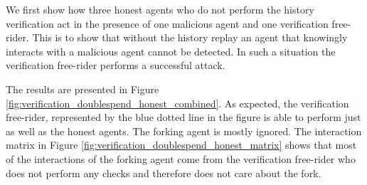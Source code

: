 We first show how three honest agents who do not perform the history verification act in the 
presence of one malicious agent and one verification free-rider. This is to show that without the 
history replay an agent that knowingly interacts with a malicious agent cannot be detected. In such 
a situation the verification free-rider performs a successful attack.

The results are presented in Figure \ref{fig:verification_doublespend_honest_combined}. As expected,
the verification free-rider, represented by the blue dotted line in the figure is able to perform 
just as well as the honest agents. The forking agent is mostly ignored. The interaction matrix in 
Figure \ref{fig:verification_doublespend_honest_matrix} shows that most of the interactions of the 
forking agent come from the verification free-rider who does not perform any checks and therefore 
does not care about the fork.

